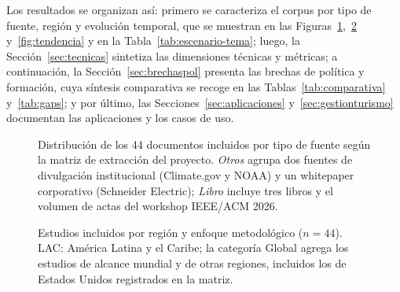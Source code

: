 \documentclass[conference]{IEEEtran}
\begin{document}
Los resultados se organizan as\'i: primero se caracteriza el corpus por tipo de fuente, regi\'on y evoluci\'on temporal, que se muestran en las Figuras~\ref{fig:tiposfuente},~\ref{fig:regiones} y~\ref{fig:tendencia} y en la Tabla~\ref{tab:escenario-tema}; luego, la Secci\'on~\ref{sec:tecnicas} sintetiza las dimensiones t\'ecnicas y m\'etricas; a continuaci\'on, la Secci\'on~\ref{sec:brechaspol} presenta las brechas de pol\'itica y formaci\'on, cuya s\'intesis comparativa se recoge en las Tablas~\ref{tab:comparativa} y~\ref{tab:gaps}; y por \'ultimo, las Secciones~\ref{sec:aplicaciones} y~\ref{sec:gestionturismo} documentan las aplicaciones y los casos de uso.

\begin{figure}[H]
\centering
{}
\caption{Distribuci\'on de los 44 documentos incluidos por tipo de fuente seg\'un la matriz de extracci\'on del proyecto. \emph{Otros} agrupa dos fuentes de divulgaci\'on institucional (Climate.gov y NOAA) y un whitepaper corporativo (Schneider Electric); \emph{Libro} incluye tres libros y el volumen de actas del workshop IEEE/ACM 2026.}
\label{fig:tiposfuente}
\end{figure}

\begin{figure}[H]
\centering
{}
\caption{Estudios incluidos por regi\'on y enfoque metodol\'ogico ($n=44$). LAC: Am\'erica Latina y el Caribe; la categor\'ia Global agrega los estudios de alcance mundial y de otras regiones, incluidos los de Estados Unidos registrados en la matriz.}
\label{fig:regiones}
\end{figure}
\end{document}
